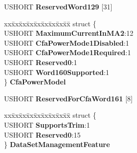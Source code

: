 \begin{DoxyCompactItemize}
\begin{tabbing}
\end{tabbing}\item 
\mbox{\label{struct___i_d_e_n_t_i_f_y___d_e_v_i_c_e___d_a_t_a_a9268f05cb42a5466136808f05a8fe46d}} 
U\+S\+H\+O\+RT {\bfseries Reserved\+Word129} \mbox{[}31\mbox{]}
\item 
\mbox{\label{struct___i_d_e_n_t_i_f_y___d_e_v_i_c_e___d_a_t_a_ae851e9564f8f4dc10b3283148f95a249}} 
\begin{tabbing}
xx\=xx\=xx\=xx\=xx\=xx\=xx\=xx\=xx\=\kill
struct \{\\
\>USHORT {\bfseries MaximumCurrentInMA2}:12\\
\>USHORT {\bfseries CfaPowerMode1Disabled}:1\\
\>USHORT {\bfseries CfaPowerMode1Required}:1\\
\>USHORT {\bfseries Reserved0}:1\\
\>USHORT {\bfseries Word160Supported}:1\\
\} {\bfseries CfaPowerModel}\\

\end{tabbing}\item 
\mbox{\label{struct___i_d_e_n_t_i_f_y___d_e_v_i_c_e___d_a_t_a_aa17f9092a9fbe9585937ebac9b41d698}} 
U\+S\+H\+O\+RT {\bfseries Reserved\+For\+Cfa\+Word161} \mbox{[}8\mbox{]}
\item 
\mbox{\label{struct___i_d_e_n_t_i_f_y___d_e_v_i_c_e___d_a_t_a_ab4c6da2363be11b69014a0fbaf2c3f36}} 
\begin{tabbing}
xx\=xx\=xx\=xx\=xx\=xx\=xx\=xx\=xx\=\kill
struct \{\\
\>USHORT {\bfseries SupportsTrim}:1\\
\>USHORT {\bfseries Reserved0}:15\\
\} {\bfseries DataSetManagementFeature}\\


\end{tabbing}
\end{DoxyCompactItemize}
